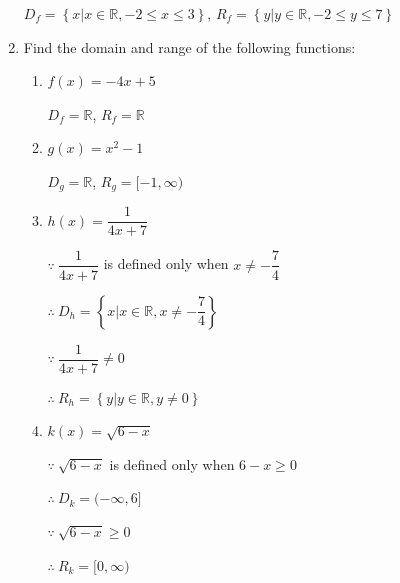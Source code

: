 \documentclass[12pt]{report}
\begin{document}
\begin{enumerate}
            \sol{}

            $D_f = \left\{x \vert x \in \mathbb{R}, -2 \leq x \leq 3\right\}$, $R_f = \left\{y
                  \vert y \in \mathbb{R}, -2 \leq y \leq 7\right\}$

      \item Find the domain and range of the following functions:
            \setlength{\columnseprule}{1pt} \setlength{\columnsep}{24pt}

            \begin{multicols}{2}
                  \begin{enumerate}
                        \item $f (x) = -4x + 5$
                              \sol{}

                              $D_f = \mathbb{R}$, $R_f = \mathbb{R}$

                        \item $g(x) = x^2 - 1$
                              \sol{}

                              $D_g = \mathbb{R}$, $R_g = [-1, \infty)$

                        \item $h(x) = \dfrac{1}{4x + 7}$
                              \sol{}

                              $\because\ \dfrac{1}{4x + 7}$ is defined only when $x \neq -\dfrac{7}{4}$

                              $\therefore\ D_h = \left\{x \vert x \in \mathbb{R}, x \neq -\dfrac{7}{4}\right\}$

                              $\because\ \dfrac{1}{4x + 7} \neq 0$

                              $\therefore\ R_h = \left\{y \vert y \in \mathbb{R}, y \neq 0\right\}$

                        \item $k(x) = \sqrt{6 - x}$
                              \sol{}

                              $\because\ \sqrt{6 - x}$ is defined only when $6 - x \geq 0$

                              $\therefore\ D_k = (-\infty, 6]$

                              $\because\ \sqrt{6 - x} \geq 0$

                              $\therefore\ R_k = [0, \infty)$
                  \end{enumerate}
            \end{multicols}
\end{enumerate}
\end{document}
